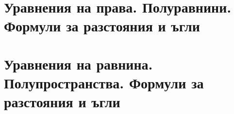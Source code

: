 \section{Уравнения на права. Полуравнини. Формули за разстояния и ъгли}
\section{Уравнения на равнина. Полупространства. Формули за разстояния и ъгли}